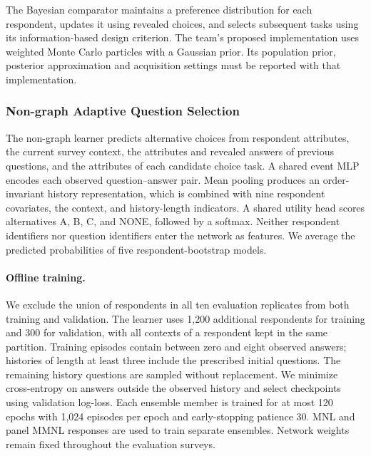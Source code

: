 The Bayesian comparator maintains a preference distribution for each
respondent, updates it using revealed choices, and selects subsequent tasks
using its information-based design criterion. The team's proposed
implementation uses weighted Monte Carlo particles with a Gaussian prior.
Its population prior, posterior approximation and acquisition settings must be
reported with that implementation.

\subsubsection{Non-graph Adaptive Question Selection}

The non-graph learner predicts alternative choices from respondent attributes,
the current survey context, the attributes and revealed answers of previous
questions, and the attributes of each candidate choice task. A shared event MLP
encodes each observed question--answer pair. Mean pooling produces an
order-invariant history representation, which is combined with nine respondent
covariates, the context, and history-length indicators. A shared utility head
scores alternatives A, B, C, and NONE, followed by a softmax. Neither respondent
identifiers nor question identifiers enter the network as features. We average
the predicted probabilities of five respondent-bootstrap models.

\paragraph{Offline training.}
We exclude the union of respondents in all ten evaluation replicates from both
training and validation. The learner uses 1,200 additional respondents for
training and 300 for validation, with all contexts of a respondent kept in the
same partition. Training episodes contain between zero and eight observed
answers; histories of length at least three include the prescribed initial
questions. The remaining history questions are sampled without replacement.
We minimize cross-entropy on answers outside the observed history and select
checkpoints using validation log-loss. Each ensemble member is trained for at
most 120 epochs with 1,024 episodes per epoch and early-stopping patience 30.
MNL and panel MMNL responses are used to train separate ensembles. Network
weights remain fixed throughout the evaluation surveys.

